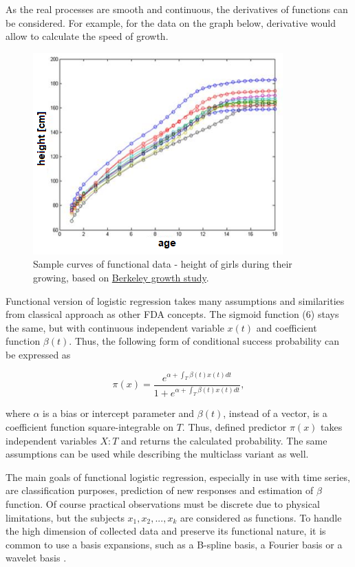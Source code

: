 \documentclass[energies,article,submit,pdftex,moreauthors]{Definitions/mdpi}
\begin{document}
As the real processes are smooth and continuous, the derivatives of functions can be considered. For example, for the data on the graph below, derivative would allow to calculate the speed of growth.
\begin{figure}[H]
\includegraphics[width=10.5 cm]{images/berkeley}
\caption{Sample curves of functional data - height of girls during their growing, based on \href{https://www.jstor.org/stable/1125347}{Berkeley growth study}.}
\end{figure}
\unskip

\vspace{5mm}
Functional version of logistic regression takes many assumptions and similarities from classical approach as other FDA concepts. The sigmoid function (6) stays the same, but with continuous independent variable $ x(t) $ and coefficient function $ \beta(t)$. Thus, the following form of conditional success probability can be expressed as
\begin{linenomath}
\begin{equation}
\pi(x) = \frac{e^{\alpha + \int_T \beta(t)x(t)dt}}{1 + e^{\alpha + \int_T \beta(t)x(t)dt}},
\end{equation}
\end{linenomath}
where $\alpha$ is a bias or intercept parameter and $\beta(t)$, instead of a vector, is a coefficient function square-integrable on $T$. Thus, defined predictor $\pi(x)$ takes independent variables $X : T$ and returns the calculated probability. The same assumptions can be used while describing the multiclass variant as well. 

The main goals of functional logistic regression, especially in use with time series, are classification purposes, prediction of new responses and estimation of $\beta$ function. Of course practical observations must be discrete due to physical limitations, but the subjects $x_1, x_2, ..., x_k$ are considered as functions. To handle the high dimension of collected data and preserve its functional nature, it is common to use a basis expansions, such as a B-spline basis, a Fourier basis or a wavelet basis \cite{logreg-comparison}. 
\end{document}
